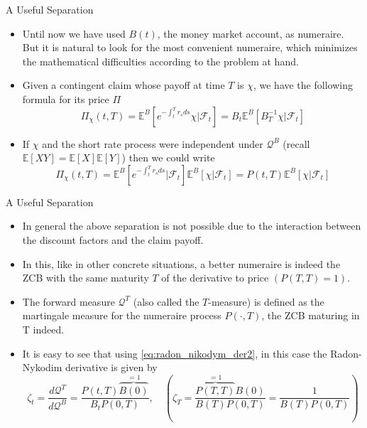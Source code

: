 \documentclass{beamer}
\begin{document}
\begin{frame}{A Useful Separation}
	\begin{itemize}
	\item Until now we have used $B(t)$, the money market account, as numeraire. But it is natural to look for the most convenient numeraire, which minimizes the mathematical difficulties according to the problem at hand.
	\item Given a contingent claim whose payoff at time $T$ is $\chi$, we have the following formula for its price $\Pi$
	\begin{equation*}
	\Pi_\chi(t,T)=\mathbb{E}^B\left[e^{-\int_t^T r_s ds}\chi\bigg|\mathcal{F}_t \right]=B_t\mathbb{E}^B\left[B^{-1}_T\chi|\mathcal{F}_t\right]
	\end{equation*}
	\item If $\chi$ and the short rate process were independent under $\mathcal{Q}^B$ (recall $\mathbb{E}[XY]=\mathbb{E}[X]\mathbb{E}[Y]$) then we could write
	\begin{equation*}
	\Pi_\chi(t,T)=\mathbb{E}^B\left[e^{-\int_t^T r_s ds}\bigg|\mathcal{F}_t\right]\mathbb{E}^B\left[\chi|\mathcal{F}_t\right] = P(t,T)\mathbb{E}^B\left[\chi|\mathcal{F}_t\right]
	\end{equation*}
	\end{itemize}
\end{frame}

\begin{frame}{A Useful Separation}
	\begin{itemize}
		\item In general the above separation is not possible due to the interaction between the discount factors and the claim payoff. 
		\item In this, like in other concrete situations, a better numeraire is indeed the ZCB with the same maturity $T$ of the derivative to price $(P(T,T)=1)$.
		\item The forward measure $\mathcal{Q}^T$ (also called the $T$-measure) is defined as the martingale measure for the numeraire process $P(\cdot,T)$, the ZCB maturing in T indeed.
		\item It is easy to see that using \cref{eq:radon_nikodym_der2}, in this case the Radon-Nykodim derivative is given by
		\begin{equation}
			\zeta_t = \frac{d\mathcal{Q}^T}{d\mathcal{Q}^B} = \frac{P(t,T)\overbrace{B(0)}^{=1}}{B_t P(0,T)} ,\quad\left(\zeta_T=\frac{\overbrace{P(T,T)}^{=1}B(0)}{B(T)P(0,T)}=\frac{1}{B(T)P(0,T)}\right)
		\label{eq:radon_nikodym_t_forward}
		\end{equation}
	\end{itemize}
\end{frame}
\end{document}

